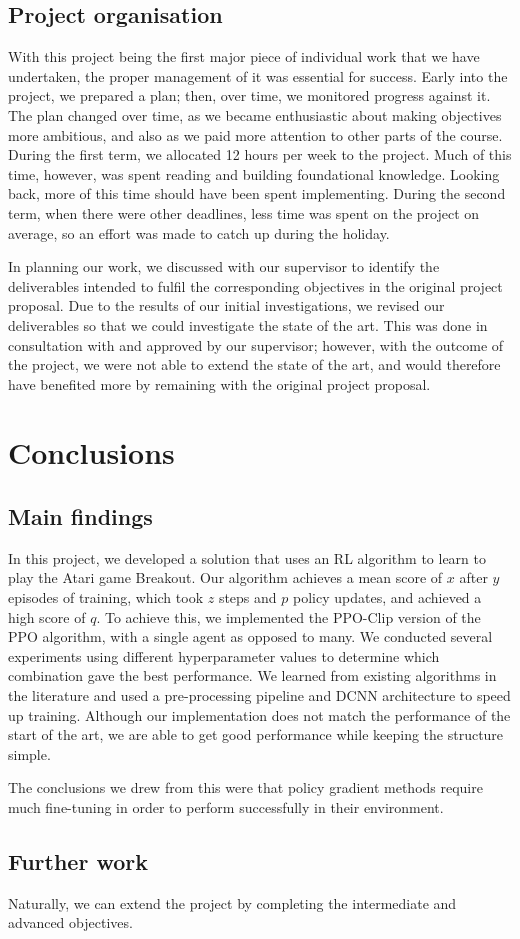 \documentclass[12pt,a4paper]{article}
\begin{document}
\subsection{Project organisation}
With this project being the first major piece of individual work that we have undertaken, the proper management of it was essential for success. Early into the project, we prepared a plan; then, over time, we monitored progress against it. The plan changed over time, as we became enthusiastic about making objectives more ambitious, and also as we paid more attention to other parts of the course. During the first term, we allocated 12 hours per week to the project. Much of this time, however, was spent reading and building foundational knowledge. Looking back, more of this time should have been spent implementing. During the second term, when there were other deadlines, less time was spent on the project on average, so an effort was made to catch up during the holiday. 

In planning our work, we discussed with our supervisor to identify the deliverables intended to fulfil the corresponding objectives in the original project proposal. Due to the results of our initial investigations, we revised our deliverables so that we could investigate the state of the art. This was done in consultation with and approved by our supervisor; however, with the outcome of the project, we were not able to extend the state of the art, and would therefore have benefited more by remaining with the original project proposal. 

\section{Conclusions}
\subsection{Main findings}
In this project, we developed a solution that uses an RL algorithm to learn to play the Atari game Breakout. Our algorithm achieves a mean score of $x$ after $y$ episodes of training, which took $z$ steps and $p$ policy updates, and achieved a high score of $q$. To achieve this, we implemented the PPO-Clip version of the PPO algorithm, with a single agent as opposed to many. We conducted several experiments using different hyperparameter values to determine which combination gave the best performance. We learned from existing algorithms in the literature and used a pre-processing pipeline and DCNN architecture to speed up training. Although our implementation does not match the performance of the start of the art, we are able to get good performance while keeping the structure simple. 

The conclusions we drew from this were that policy gradient methods require much fine-tuning in order to perform successfully in their environment. 

\subsection{Further work}
Naturally, we can extend the project by completing the intermediate and advanced objectives.


\end{document}
